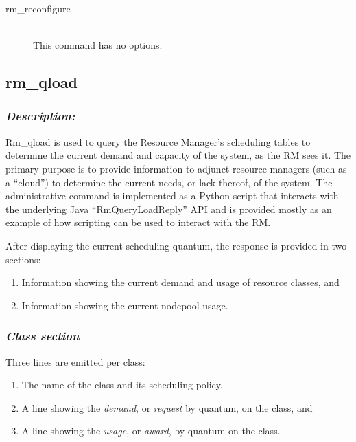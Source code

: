     \begin{description}
      \item[rm\_reconfigure] \hfill \\ 
        This command has no options.
      \end{description}
             
       
\iffalse  %

\subsection{rm\_qload}
\label{subsec:admin.rm-qload}

    \subsubsection{{\em Description:}}
    Rm\_qload is used to query the Resource Manager's scheduling tables to determine the
    current demand and capacity of the system, as the RM sees it.  The primary purpose
    is to provide information to adjunct resource managers (such as a ``cloud'') to
    determine the current needs, or lack thereof, of the system.  The administrative
    command is implemented as a Python script that interacts with the underlying
    Java ``RmQueryLoadReply'' API and is provided mostly as an example of how
    scripting can be used to interact with the RM.

    After displaying the current scheduling quantum, the response is provided in two sections:
    \begin{enumerate}
      \item Information showing the current demand and usage of resource classes, and
      \item Information showing the current nodepool usage.
    \end{enumerate}

    \subsubsection{\em Class section}
    Three lines are emitted per class:
    \begin{enumerate}
      \item The name of the class and its scheduling policy,
      \item A line showing the {\em demand}, or {\em request} by quantum, on the class, and
      \item A line showing the {\em usage}, or {\em award}, by quantum on the class.
    \end{enumerate}
    
